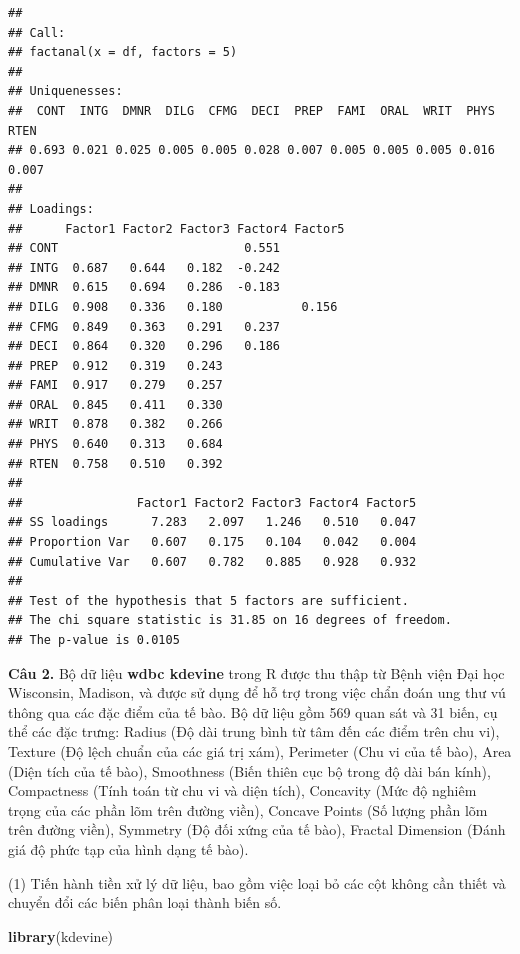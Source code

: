 \documentclass[
]{article}
\newenvironment{Shaded}{\begin{snugshade}}{\end{snugshade}}
\newcommand{\FunctionTok}[1]{\textcolor[rgb]{0.13,0.29,0.53}{\textbf{#1}}}
\newcommand{\NormalTok}[1]{#1}
\begin{document}
\begin{verbatim}
## 
## Call:
## factanal(x = df, factors = 5)
## 
## Uniquenesses:
##  CONT  INTG  DMNR  DILG  CFMG  DECI  PREP  FAMI  ORAL  WRIT  PHYS  RTEN 
## 0.693 0.021 0.025 0.005 0.005 0.028 0.007 0.005 0.005 0.005 0.016 0.007 
## 
## Loadings:
##      Factor1 Factor2 Factor3 Factor4 Factor5
## CONT                          0.551         
## INTG  0.687   0.644   0.182  -0.242         
## DMNR  0.615   0.694   0.286  -0.183         
## DILG  0.908   0.336   0.180           0.156 
## CFMG  0.849   0.363   0.291   0.237         
## DECI  0.864   0.320   0.296   0.186         
## PREP  0.912   0.319   0.243                 
## FAMI  0.917   0.279   0.257                 
## ORAL  0.845   0.411   0.330                 
## WRIT  0.878   0.382   0.266                 
## PHYS  0.640   0.313   0.684                 
## RTEN  0.758   0.510   0.392                 
## 
##                Factor1 Factor2 Factor3 Factor4 Factor5
## SS loadings      7.283   2.097   1.246   0.510   0.047
## Proportion Var   0.607   0.175   0.104   0.042   0.004
## Cumulative Var   0.607   0.782   0.885   0.928   0.932
## 
## Test of the hypothesis that 5 factors are sufficient.
## The chi square statistic is 31.85 on 16 degrees of freedom.
## The p-value is 0.0105
\end{verbatim}

\hfill\break
\textbf{Câu 2. } Bộ dữ liệu \textbf{wdbc {kdevine}} trong R được thu
thập từ Bệnh viện Đại học Wisconsin, Madison, và được sử dụng để hỗ trợ
trong việc chẩn đoán ung thư vú thông qua các đặc điểm của tế bào. Bộ dữ
liệu gồm 569 quan sát và 31 biến, cụ thể các đặc trưng: Radius (Độ dài
trung bình từ tâm đến các điểm trên chu vi), Texture (Độ lệch chuẩn của
các giá trị xám), Perimeter (Chu vi của tế bào), Area (Diện tích của tế
bào), Smoothness (Biến thiên cục bộ trong độ dài bán kính), Compactness
(Tính toán từ chu vi và diện tích), Concavity (Mức độ nghiêm trọng của
các phần lõm trên đường viền), Concave Points (Số lượng phần lõm trên
đường viền), Symmetry (Độ đối xứng của tế bào), Fractal Dimension (Đánh
giá độ phức tạp của hình dạng tế bào).

\hfill\break
(1) Tiến hành tiền xử lý dữ liệu, bao gồm việc loại bỏ các cột không cần
thiết và chuyển đổi các biến phân loại thành biến số.

\begin{Shaded}
\begin{Highlighting}[]
\FunctionTok{library}\NormalTok{(kdevine)}
\end{Highlighting}
\end{Shaded}
\end{document}
